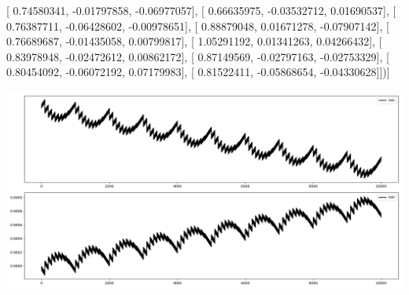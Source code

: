 \documentclass{article}
\begin{document}
       [ 0.74580341, -0.01797858, -0.06977057],
       [ 0.66635975, -0.03532712,  0.01690537],
       [ 0.76387711, -0.06428602, -0.00978651],
       [ 0.88879048,  0.01671278, -0.07907142],
       [ 0.76689687, -0.01435058,  0.00799817],
       [ 1.05291192,  0.01341263,  0.04266432],
       [ 0.83978948, -0.02472612,  0.00862172],
       [ 0.87149569, -0.02797163, -0.02753329],
       [ 0.80454092, -0.06072192,  0.07179983],
       [ 0.81522411, -0.05868654, -0.04330628]])]
\begin{center}
\includegraphics[scale=.9]{control_dpn_all.png}

\end{center}
\end{document}
